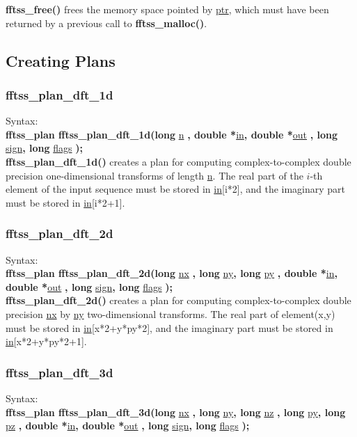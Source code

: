 \documentclass{article}
\begin{document}
{\bf fftss\_free()} frees the memory space pointed by \underline{ptr},
 which must have been returned by a previous call to {\bf fftss\_malloc()}.

\subsection{Creating Plans}

\subsubsection{fftss\_plan\_dft\_1d}
Syntax:\\
{\bf fftss\_plan fftss\_plan\_dft\_1d(long }\underline{n}
{\bf , double *}\underline{in}{\bf , double *}\underline{out}
{\bf , long }\underline{sign}{\bf , long }\underline{flags}
{\bf );}\\

{\bf fftss\_plan\_dft\_1d()} creates a plan for computing complex-to-complex double precision one-dimensional transforms of length 
\underline{n}. The real part of the $i$-th element of the input sequence must be stored in \underline{in}[i*2],
and the imaginary part must be stored in \underline{in}[i*2+1]. 

\subsubsection{fftss\_plan\_dft\_2d}
Syntax:\\
{\bf fftss\_plan fftss\_plan\_dft\_2d(long }\underline{nx}
{\bf , long }\underline{ny}{\bf , long }\underline{py}
{\bf , double *}\underline{in}{\bf , double *}\underline{out}
{\bf , long }\underline{sign}{\bf , long }\underline{flags}
{\bf );}\\

{\bf fftss\_plan\_dft\_2d()} creates a plan for computing complex-to-complex
double precision \underline{nx} by \underline{ny} two-dimensional transforms.
The real part of element(x,y) must be stored in 
\underline{in}[x*2+y*py*2],
and the imaginary part must be stored in \underline{in}[x*2+y*py*2+1]. 

\subsubsection{fftss\_plan\_dft\_3d}
Syntax:\\
{\bf fftss\_plan fftss\_plan\_dft\_3d(long }\underline{nx}
{\bf , long }\underline{ny}{\bf , long }\underline{nz}
{\bf , long }\underline{py}{\bf , long }\underline{pz}
{\bf , double *}\underline{in}{\bf , double *}\underline{out}
{\bf , long }\underline{sign}{\bf , long }\underline{flags}
{\bf );}\\
\end{document}
